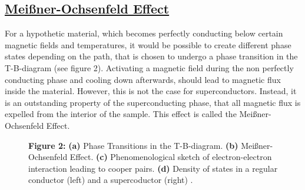 \documentclass[a4paper]{scrartcl}
\numberwithin{equation}{section}
\numberwithin{figure}{section}
\numberwithin{table}{section}
\newcommand{\ssubsection}[1]{{ \subsection*{\linebreak \centering\bf\underline {#1}}}}
\begin{document}
\ssubsection{Mei\ss ner-Ochsenfeld Effect}
For a hypothetic material, which becomes perfectly conducting below certain magnetic fields and temperatures, it would be possible to create different phase states depending on the path, that is chosen to undergo a phase transition in the T-B-diagram (see figure 2). Activating a magnetic field during the non perfectly conducting phase and cooling down afterwards, should lead to magnetic flux inside the material. However, this is not the case for superconductors. Instead, it is an outstanding property of the superconducting phase, that all magnetic flux is expelled from the interior of the sample. This effect is called the Meißner-Ochsenfeld Effect.

\begin{figure}[!tbh]
\caption*{\textbf{Figure 2: }\small \textbf{(a)} Phase Transitions in the T-B-diagram. \textbf{(b)} Meißner-Ochsenfeld Effect. \textbf{(c)} Phenomenological sketch of electron-electron interaction leading to cooper pairs. \textbf{(d)} Density of states in a regular conductor (left) and a supercoductor (right) \cite{buckel}.}
\label{fig:tb}
\end{figure}
\end{document}
